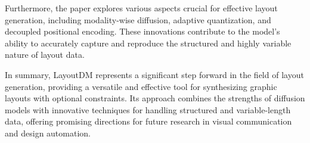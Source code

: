 Furthermore, the paper explores various aspects crucial for effective layout generation, including modality-wise diffusion, adaptive quantization, and decoupled positional encoding. These innovations contribute to the model's ability to accurately capture and reproduce the structured and highly variable nature of layout data.

In summary, LayoutDM represents a significant step forward in the field of layout generation, providing a versatile and effective tool for synthesizing graphic layouts with optional constraints. Its approach combines the strengths of diffusion models with innovative techniques for handling structured and variable-length data, offering promising directions for future research in visual communication and design automation.